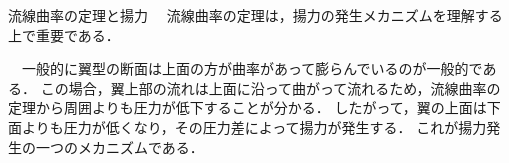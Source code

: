 \documentclass[uplatex,dvipdfmx,a4j,11pt]{jsreport}
\newcommand{\e}{\mathbf{e}} %
\newcommand{\diff}{\mathrm{d}} %
\numberwithin{equation}{chapter}
\begin{document}
\begin{aside}{流線曲率の定理と揚力}{}{}
  　流線曲率の定理は，揚力の発生メカニズムを理解する上で重要である．

  　一般的に翼型の断面は上面の方が曲率があって膨らんでいるのが一般的である．
  この場合，翼上部の流れは上面に沿って曲がって流れるため，流線曲率の定理から周囲よりも圧力が低下することが分かる．
  したがって，翼の上面は下面よりも圧力が低くなり，その圧力差によって揚力が発生する．
  これが揚力発生の一つのメカニズムである．
\end{aside}




\end{document}
